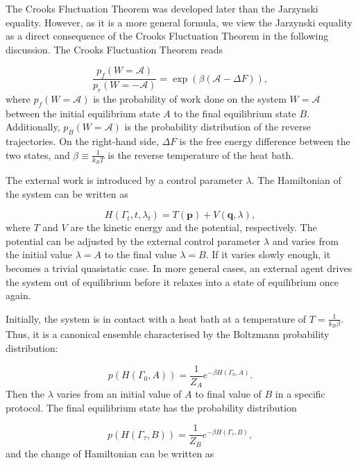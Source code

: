 \documentclass[ reprint, amsmath,amssymb, aps,]{revtex4-1}
\begin{document}
The Crooks Fluctuation Theorem was developed later than the Jarzynski equality. However, as it is a more general formula, we view the Jarzynski equality as a direct consequence of the Crooks Fluctuation Theorem in the following discussion. The Crooks Fluctuation Theorem reads

\begin{equation}
\frac{p_f(W=\mathcal{A})}{p_r(W=-\mathcal{A})}=\exp\left(\beta(\mathcal{A}-\Delta F)\right),
\end{equation}
where $p_f(W=\mathcal{A})$ is the probability of work done on the system $W=\mathcal{A}$ between the initial equilibrium state $A$ to the final equilibrium state $B$. Additionally, $p_B(W=\mathcal{A})$ is the probability distribution of the reverse trajectories. On the right-hand side, $\Delta F$ is the free energy difference between the two states, and $\beta\equiv\frac{1}{k_BT} $ is the reverse temperature of the heat bath.


The external work is introduced by a control parameter $\lambda$. The Hamiltonian of the system can be written as

\begin{equation}
H(\Gamma_t,t,\lambda_t)=T(\mathbf{p})+V(\mathbf{q},\lambda),
\end{equation}
where $T$ and $V$ are the kinetic energy and the potential, respectively. The potential can be adjusted by the external control parameter $\lambda$ and varies from the initial value $\lambda=A$ to the final value  $\lambda=B$. If it varies slowly enough, it becomes a trivial quasistatic case. In more general cases, an external agent drives the system out of equilibrium before it relaxes into a state of equilibrium once again.%


Initially, the system is in contact with a heat bath at a temperature of $T=\frac{1}{k_B\beta}$. Thus, it is a canonical ensemble characterised by the Boltzmann probability distribution:

\begin{equation}
p(H(\Gamma_0,A))=\frac{1}{Z_A}e^{-\beta H(\Gamma_0,A)}.
\end{equation}
Then the $\lambda$ varies from an initial value of $A$ to final value of $B$ in a specific protocol. The final equilibrium state has the probability distribution

\begin{equation}
p(H(\Gamma_\tau,B))=\frac{1}{Z_B}e^{-\beta H(\Gamma_\tau,B)},
\end{equation}
and the change of Hamiltonian can be written as
\end{document}
